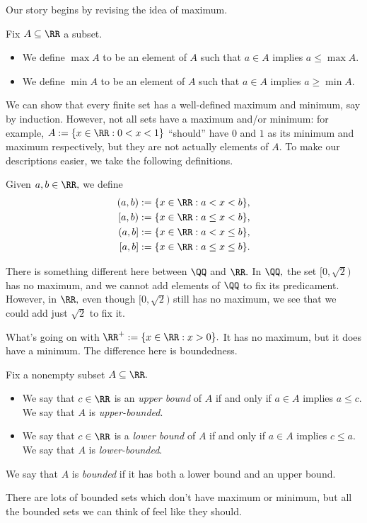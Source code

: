 Our story begins by revising the idea of maximum.
\begin{defi}
    Fix $A\subseteq\RR$ a subset.
    \begin{itemize}
        \item We define $\max A$ to be an element of $A$ such that $a\in A$ implies $a\le\max A.$
        \item We define $\min A$ to be an element of $A$ such that $a\in A$ implies $a\ge\min A.$
    \end{itemize}
\end{defi}
We can show that every finite set has a well-defined maximum and minimum, say by induction. However, not all sets have a maximum and/or minimum: for example, $A:=\{x\in\RR:0<x<1\}$ ``should'' have $0$ and $1$ as its minimum and maximum respectively, but they are not actually elements of $A.$ To make our descriptions easier, we take the following definitions.
\begin{defi}
    Given $a,b\in\RR,$ we define
    \begin{align*}
        (a,b):=\{x\in\RR:a<x<b\}, \\
        [a,b):=\{x\in\RR:a\le x<b\}, \\
        (a,b]:=\{x\in\RR:a<x\le b\}, \\
        [a,b]:=\{x\in\RR:a\le x\le b\}.
    \end{align*}
\end{defi}
There is something different here between $\QQ$ and $\RR.$ In $\QQ,$ the set $[0,\sqrt2)$ has no maximum, and we cannot add elements of $\QQ$ to fix its predicament. However, in $\RR,$ even though $[0,\sqrt2)$ still has no maximum, we see that we could add just $\sqrt2$ to fix it.

What's going on with $\RR^+:=\{x\in\RR:x>0\}.$ It has no maximum, but it does have a minimum. The difference here is boundedness.
\begin{defi}[Boundedness]
    Fix a nonempty subset $A\subseteq\RR.$
    \begin{itemize}
        \item We say that $c\in\RR$ is an \textit{upper bound} of $A$ if and only if $a\in A$ implies $a\le c.$ We say that $A$ is \textit{upper-bounded}.
        \item We say that $c\in\RR$ is a \textit{lower bound} of $A$ if and only if $a\in A$ implies $c\le a.$ We say that $A$ is \textit{lower-bounded}.
    \end{itemize}
    We say that $A$ is \textit{bounded} if it has both a lower bound and an upper bound.
\end{defi}
There are lots of bounded sets which don't have maximum or minimum, but all the bounded sets we can think of feel like they should.

